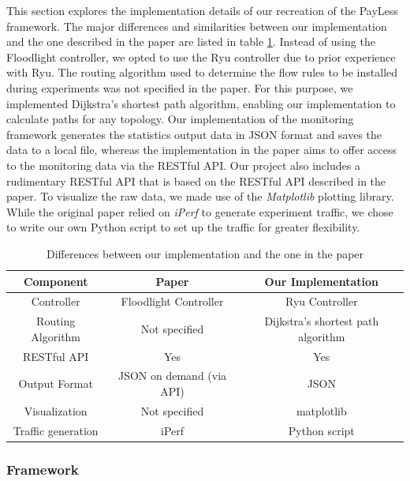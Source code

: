 \documentclass[DIV=12]{scrartcl}
\begin{document}
This section explores the implementation details of our recreation of the PayLess framework. The major differences and similarities between our implementation and the one
described in the paper are listed in table \ref{tab:differences}. Instead of using the Floodlight controller, we opted to use the Ryu controller due to prior experience with Ryu. The routing algorithm used to determine the flow rules to be installed during experiments was not specified in the paper. For this purpose, we implemented Dijkstra's shortest path algorithm, enabling our implementation to calculate paths for any topology. Our implementation of the monitoring framework generates the statistics output data in JSON format and saves the data to a local file, whereas the implementation in the paper aims to offer access to the monitoring data via the RESTful API.
Our project also includes a rudimentary RESTful API that is based on the RESTful API described in the paper. 
To visualize the raw data, we made use of the \textit{Matplotlib} plotting library. While the original paper relied on \textit{iPerf} to generate experiment traffic, we chose to write our own Python script to set up the traffic for greater flexibility.

\begin{table}[]
    \centering
    \begin{tabular}{|c|c|c|}
        \hline
         Component & Paper & Our Implementation \\
         \hline
         Controller & Floodlight Controller & Ryu Controller \\
         Routing Algorithm & Not specified & Dijkstra's shortest path algorithm \\
         RESTful API & Yes & Yes \\
         Output Format & JSON on demand (via API) & JSON \\
         Visualization & Not specified & matplotlib \\
         Traffic generation & iPerf & Python script \\
         \hline
    \end{tabular}
    \caption{Differences between our implementation and the one in the paper}
    \label{tab:differences}
\end{table}

\subsubsection{Framework}
\end{document}
